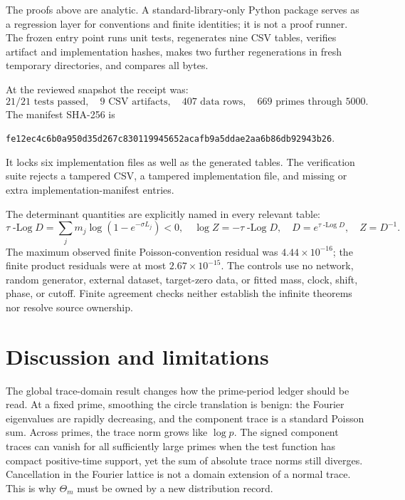 \documentclass[11pt,a4paper]{article}
\theoremstyle{definition}
\begin{document}
The proofs above are analytic.  A standard-library-only Python package serves
as a regression layer for conventions and finite identities; it is not a
proof runner.  The frozen entry point runs unit tests, regenerates nine CSV
tables, verifies artifact and implementation hashes, makes two further
regenerations in fresh temporary directories, and compares all bytes.

At the reviewed snapshot the receipt was:
\begin{equation*}
 \text{21/21 tests passed},\quad
 \text{9 CSV artifacts},\quad
 \text{407 data rows},\quad
 \text{669 primes through 5000}.
\end{equation*}
The manifest SHA-256 is
\begin{center}
\small\texttt{fe12ec4c6b0a950d35d267c830119945652acafb9a5ddae2aa6b86db92943b26}.
\end{center}
It locks six implementation files as well as the generated tables.  The
verification suite rejects a tampered CSV, a tampered implementation file,
and missing or extra implementation-manifest entries.

The determinant quantities are explicitly named in every relevant table:
\begin{equation}
 \tau\!\operatorname{-Log}D
   =\sum_jm_j\log(1-e^{-\sigma L_j})<0,
 \quad
 \log Z=-\tau\!\operatorname{-Log}D,
 \quad
 D=e^{\tau\operatorname{-Log}D},
 \quad Z=D^{-1}.
 \label{eq:control-sign}
\end{equation}
The maximum observed finite Poisson-convention residual was
$4.44\times10^{-16}$; the finite product residuals were at most
$2.67\times10^{-15}$.  The controls use no network, random generator,
external dataset, target-zero data, or fitted mass, clock, shift, phase, or
cutoff.  Finite agreement checks neither establish the infinite theorems nor
resolve source ownership.

\section{Discussion and limitations}
\label{sec:discussion}

The global trace-domain result changes how the prime-period ledger should be
read.  At a fixed prime, smoothing the circle translation is benign: the
Fourier eigenvalues are rapidly decreasing, and the component trace is a
standard Poisson sum.  Across primes, the trace norm grows like $\log p$.
The signed component traces can vanish for all sufficiently large primes when
the test function has compact positive-time support, yet the sum of absolute
trace norms still diverges.  Cancellation in the Fourier lattice is not a
domain extension of a normal trace.  This is why $\Theta_m$ must be owned by a
new distribution record.
\end{document}
